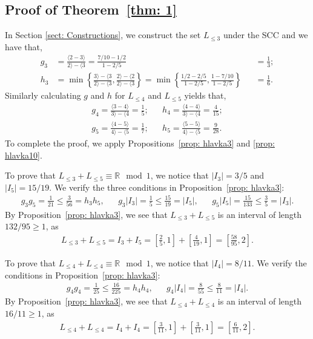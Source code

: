 \documentclass{ws-ijnt}
\begin{document}
	\subsection{Proof of Theorem~\ref{thm: 1}}\label{subsectproof1}
	In Section \ref{sect: Constructions}, we construct the set $L_{\leq 3}$ under the SCC and we have that,
	\begin{align*}
		g_3
		&= \frac{\langle2-3\rangle}{2\rangle-\langle3}=\frac{7/10-1/2}{1-2/5}
		&&= \frac13; \\
		h_3
		&=\min{\left\{\frac{3\rangle-\langle3}{2\rangle-\langle3},\frac{2\rangle-\langle2}{2\rangle-\langle3}\right\}}
		=\min{\left\{\frac{1/2-2/5}{1-2/5},\frac{1-7/10}{1-2/5}\right\}}
		&&= \frac{1}{6}.
	\end{align*}
	Similarly calculating $g$ and $h$ for $L_{\leq 4}$ and $L_{\leq 5}$ yields that,
	\begin{align*}
		g_4
		= \frac{\langle3-4\rangle}{3\rangle-\langle4}
		= \frac{1}{5}; &&
		h_4
		= \frac{\langle4-4\rangle}{3\rangle-\langle4}
		= \frac{4}{15}; \\
		g_5
		= \frac{\langle4-5\rangle}{4\rangle-\langle5}
		= \frac{1}{7} ; &&
		h_5
		= \frac{\langle5-5\rangle}{4\rangle-\langle5}
		= \frac{9}{28}.
	\end{align*}
	To complete the proof, we apply Propositions~\ref{prop: hlavka3} and \ref{prop: hlavka10}.
	
	To prove that $L_{\leq 3}+L_{\leq 5}\equiv\mathbb{R}\mod1$, we notice that $\lvert I_3 \rvert = 3/5$ and $\lvert I_5\rvert = 15/19$. We verify the three conditions in Proposition~\ref{prop: hlavka3}:
	\begin{align*}
		g_3 g_5
		= \frac{1}{21}
		\leq \frac{3}{56}
		= h_3h_5, &&
		g_3 \lvert I_3 \rvert
		= \frac{1}{5}
		\leq \frac{15}{19}
		= \lvert I_5 \rvert,  &&
		g_5 \lvert I_5 \rvert 
		= \frac{15}{133}
		\leq \frac{3}{5}
		= \lvert I_3 \rvert.
	\end{align*}
	By Proposition~\ref{prop: hlavka3}, we see that $L_{\leq 3}+L_{\leq 5}$ is an interval of length $132/95\geq1$, as
	\begin{align*}
		L_{\leq 3}+L_{\leq 5}
		= I_3+I_5
		= \left[\frac{2}{5},1\right]+\left[\frac{4}{19},1\right] = \left[\frac{58}{95},2\right].
	\end{align*}
	
	To prove that $L_{\leq 4}+L_{\leq 4}\equiv\mathbb{R}\mod1$, we notice that $\lvert I_4 \rvert = 8/11$. We verify the conditions in Proposition~\ref{prop: hlavka3}:
	\begin{align*}
		g_4 g_4
		= \frac{1}{25}
		\leq \frac{16}{225}
		= h_4h_4, &&
		g_4 \lvert I_4 \rvert 
		= \frac{8}{55}
		\leq \frac{8}{11}
		= \lvert I_4 \rvert.
	\end{align*}
	By Proposition~\ref{prop: hlavka3}, we see that $L_{\leq 4}+L_{\leq 4}$ is an interval of length $16/11\geq1$, as
	\begin{align*}
		L_{\leq 4}+L_{\leq 4}
		= I_4+I_4
		= \left[\frac{3}{11},1\right]+\left[\frac{3}{11},1\right] = \left[\frac{6}{11},2\right].
	\end{align*}
	
\end{document}
